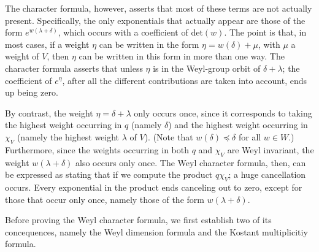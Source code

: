 The character formula, however, asserts that most of these terms are not actually present. Specifically, the only exponentials that actually appear are those of the form $e^{w(\lambda+\delta)}$, which occurs with a coefficient of $\mathrm{det}(w)$. The point is that, in most cases, if a weight $\eta$ can be written in the form $\eta=w(\delta)+\mu$, with $\mu$ a weight of $V$, then $\eta$ can be written in this form in more than one way. The character formula asserts that unless $\eta$ is in the Weyl-group orbit of $\delta+\lambda$; the coefficient of $e^{\eta}$, after all the different contributions are taken into account, ends up being zero.\par
By contrast, the weight $\eta=\delta+\lambda$ only occurs once, since it corresponds to taking the highest weight occurring in $q$ (namely $\delta$) and the highest weight occurring in $\chi_V$ (namely the highest weight $\lambda$ of $V$). (Note that $w(\delta)\preceq\delta$ for all $w\in W$.) Furthermore, since the weights occurring in both $q$ and $\chi_V$ are Weyl invariant, the weight $w(\lambda+\delta)$ also occurs only once. The Weyl character formula, then, can be expressed as stating that if we compute the product $q\chi_V$; a huge cancellation occurs. Every exponential in the product ends canceling out to zero, except for those that occur only once, namely those of the form $w(\lambda+\delta)$.\par
Before proving the Weyl character formula, we first establish two of its concequences, namely the Weyl dimension formula and the Kostant multiplicitiy formula.

